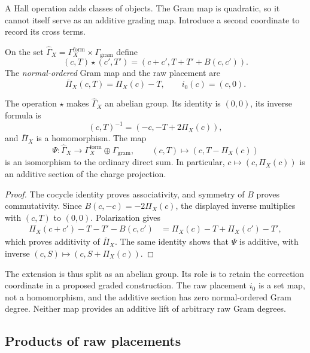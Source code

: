 A Hall operation adds classes of objects.  The Gram map is quadratic,
so it cannot itself serve as an additive grading map.  Introduce a
second coordinate to record its cross terms.

\begin{definition}
\label{def:normal-ordered-extension}
On the set
$\widehat\Gamma_X=\Gamma_X^{\mathrm{form}}\times\Gamma_{\mathrm{gram}}$
define
\[
(c,T)\star(c',T')=(c+c',T+T'+B(c,c')).
\]
The \emph{normal-ordered} Gram map and the raw placement are
\[
\overline\Pi_X(c,T)=\Pi_X(c)-T,
\qquad i_0(c)=(c,0).
\]
\end{definition}

\begin{theorem}
\label{thm:normal-ordered-extension-group-law}
The operation $\star$ makes $\widehat\Gamma_X$ an abelian group.
Its identity is $(0,0)$, its inverse formula is
\[
(c,T)^{-1}=(-c,-T+2\Pi_X(c)),
\]
and $\overline\Pi_X$ is a homomorphism.  The map
\[
\Psi:\widehat\Gamma_X\longrightarrow
\Gamma_X^{\mathrm{form}}\oplus\Gamma_{\mathrm{gram}},
\qquad (c,T)\longmapsto(c,T-\Pi_X(c))
\]
is an isomorphism to the ordinary direct sum.  In particular,
$c\mapsto(c,\Pi_X(c))$ is an additive section of the charge projection.
\end{theorem}

\begin{proof}
The cocycle identity proves associativity, and symmetry of $B$ proves
commutativity.  Since $B(c,-c)=-2\Pi_X(c)$, the displayed inverse
multiplies with $(c,T)$ to $(0,0)$.  Polarization gives
\[
\begin{split}
\Pi_X(c+c')-T-T'-B(c,c')
&=\Pi_X(c)-T+\Pi_X(c')-T',
\end{split}
\]
which proves additivity of $\overline\Pi_X$.  The same identity shows
that $\Psi$ is additive, with inverse $(c,S)\mapsto(c,S+\Pi_X(c))$.
\end{proof}

The extension is thus split as an abelian group.  Its role is to
retain the correction coordinate in a proposed graded construction.
The raw placement $i_0$ is a set map, not a homomorphism, and the
additive section has zero normal-ordered Gram degree.  Neither map
provides an additive lift of arbitrary raw Gram degrees.

\subsection{Products of raw placements}
\label{subsec:normal-ordering-flag-formula}

